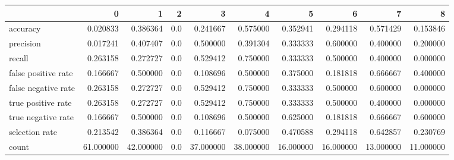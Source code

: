 \begin{tabular}{lrrrrrrrrr}
\toprule
{} &          0 &          1 &    2 &          3 &          4 &          5 &          6 &          7 &          8 \\
\midrule
accuracy            &   0.020833 &   0.386364 &  0.0 &   0.241667 &   0.575000 &   0.352941 &   0.294118 &   0.571429 &   0.153846 \\
precision           &   0.017241 &   0.407407 &  0.0 &   0.500000 &   0.391304 &   0.333333 &   0.600000 &   0.400000 &   0.200000 \\
recall              &   0.263158 &   0.272727 &  0.0 &   0.529412 &   0.750000 &   0.333333 &   0.500000 &   0.400000 &   0.000000 \\
false positive rate &   0.166667 &   0.500000 &  0.0 &   0.108696 &   0.500000 &   0.375000 &   0.181818 &   0.666667 &   0.400000 \\
false negative rate &   0.263158 &   0.272727 &  0.0 &   0.529412 &   0.750000 &   0.333333 &   0.500000 &   0.600000 &   0.000000 \\
true positive rate  &   0.263158 &   0.272727 &  0.0 &   0.529412 &   0.750000 &   0.333333 &   0.500000 &   0.400000 &   0.000000 \\
true negative rate  &   0.166667 &   0.500000 &  0.0 &   0.108696 &   0.500000 &   0.625000 &   0.181818 &   0.666667 &   0.600000 \\
selection rate      &   0.213542 &   0.386364 &  0.0 &   0.116667 &   0.075000 &   0.470588 &   0.294118 &   0.642857 &   0.230769 \\
count               &  61.000000 &  42.000000 &  0.0 &  37.000000 &  38.000000 &  16.000000 &  16.000000 &  13.000000 &  11.000000 \\
\bottomrule
\end{tabular}
